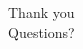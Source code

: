 \documentclass{beamer}
\begin{document}
\begin{frame}{}
  Thank you\\[20pt]
  Questions?
\end{frame}




\end{document}
